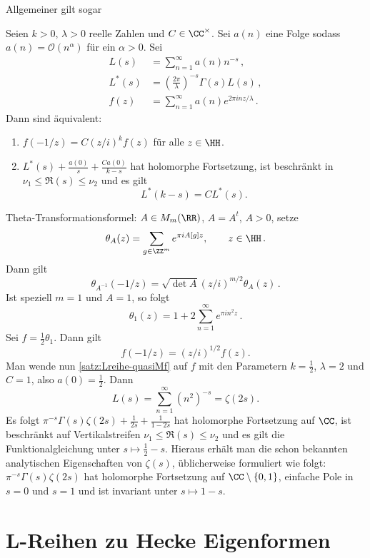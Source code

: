 Allgemeiner gilt sogar

\begin{satz}\label{satz:Lreihe-quasiMf}
	Seien $k > 0$, $\lambda >0$ reelle Zahlen und $C \in \CC^\times$. Sei $a(n)$ eine Folge sodass $a(n) = \mathcal O(n^\alpha)$ für ein $\alpha > 0$. Sei
	\begin{align*}
		L(s) &= \sum_{n=1}^\infty a(n)n^{-s}\,,\\
		L^*(s) &= \left( \frac{2\pi}{\lambda}\right)^{-s} \Gamma(s) L(s)\,,\\
		f(z) &= \sum_{n=1}^\infty a(n)e^{2\pi i nz/\lambda}\,.
	\end{align*}
	Dann sind äquivalent: 
	\begin{enumerate}
		\item $f(-1/z) = C (z/i)^{k} f(z)$ für alle $z \in \HH$.
		\item $L^*(s) + \frac{a(0)}{s} + \frac{Ca(0)}{k - s}$ hat holomorphe Fortsetzung, ist beschränkt in $\nu_1 \leq \Re(s) \leq \nu_2$ und es gilt 
		\[L^*(k - s) = C L^*(s).\]
	\end{enumerate}
\end{satz}


\begin{bsp}
	Theta-Transformationsformel: $A \in M_m(\RR)$, $A = A^t$, $A > 0$, setze
	\[
		\theta_A(z) = \sum_{g \in \ZZ^m} e^{\pi i A[g] z}, \qquad z \in \HH\,.
	\]
	Dann gilt 
	\[
		\theta_{A^{-1}}(-1/z) = \sqrt{\det A} (z / i)^{m/2} \theta_A(z)\,.
	\]
	Ist speziell $m=1$ und $A = 1$, so folgt 
	\[
		\theta_1(z) = 1 + 2\sum_{n=1}^\infty e^{\pi i n^2 z}\,.
	\]
	Sei $f = \frac12 \theta_1$. Dann gilt
	\[
		f(-1/z) = (z/i)^{1/2} f(z).
	\]
	Man wende nun \autoref{satz:Lreihe-quasiMf} auf $f$ mit den Parametern $k = \frac12$, $\lambda = 2$ und $C = 1$, also $a(0) = \frac12$. Dann
	\[
		L(s) = \sum_{n=1}^\infty (n^{2})^{-s} = \zeta(2s).
	\]
	Es folgt $\pi^{-s} \Gamma(s)\zeta(2s) + \frac{1}{2s} + \frac{1}{1-2s}$ hat holomorphe Fortsetzung auf $\CC$, ist beschränkt auf Vertikalstreifen $\nu_1 \leq \Re(s) \leq \nu_2$ und es gilt die Funktionalgleichung unter $s \mapsto \frac12 - s$. Hieraus erhält man die schon bekannten analytischen Eigenschaften von $\zeta(s)$, üblicherweise formuliert wie folgt: $\pi^{-s}\Gamma(s)\zeta(2s)$ hat holomorphe Fortsetzung auf $\CC \setminus \{0,1\}$, einfache Pole in $s= 0$ und $s=1$ und ist invariant  unter $s \mapsto 1 - s$.
\end{bsp} 


\section{L-Reihen zu Hecke Eigenformen}

